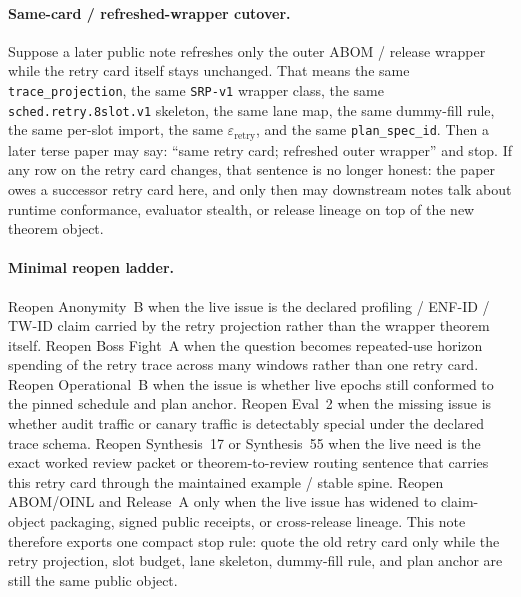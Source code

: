\documentclass[11pt]{article}
\begin{document}
\paragraph{Same-card / refreshed-wrapper cutover.}
Suppose a later public note refreshes only the outer ABOM / release wrapper while the retry card itself stays unchanged.
That means the same \texttt{trace\_projection}, the same \texttt{SRP-v1} wrapper class, the same \texttt{sched.retry.8slot.v1} skeleton, the same lane map, the same dummy-fill rule, the same per-slot import, the same $\varepsilon_{\mathrm{retry}}$, and the same \texttt{plan\_spec\_id}.
Then a later terse paper may say: ``same retry card; refreshed outer wrapper'' and stop.
If any row on the retry card changes, that sentence is no longer honest: the paper owes a successor retry card here, and only then may downstream notes talk about runtime conformance, evaluator stealth, or release lineage on top of the new theorem object.

\paragraph{Minimal reopen ladder.}
Reopen Anonymity~B when the live issue is the declared profiling / ENF-ID / TW-ID claim carried by the retry projection rather than the wrapper theorem itself.
Reopen Boss Fight~A when the question becomes repeated-use horizon spending of the retry trace across many windows rather than one retry card.
Reopen Operational~B when the issue is whether live epochs still conformed to the pinned schedule and plan anchor.
Reopen Eval~2 when the missing issue is whether audit traffic or canary traffic is detectably special under the declared trace schema.
Reopen Synthesis~17 or Synthesis~55 when the live need is the exact worked review packet or theorem-to-review routing sentence that carries this retry card through the maintained example / stable spine.
Reopen ABOM/OINL and Release~A only when the live issue has widened to claim-object packaging, signed public receipts, or cross-release lineage.
This note therefore exports one compact stop rule: quote the old retry card only while the retry projection, slot budget, lane skeleton, dummy-fill rule, and plan anchor are still the same public object.\cite{series:profiling,series:bossfightA,series:operationalB,series:advantagecontracts,series:workedexample,series:seriesspines,series:abomoinl,series:releaseproperty}
\end{document}
